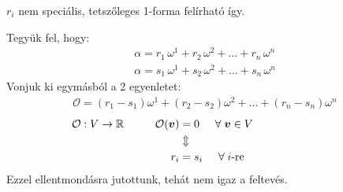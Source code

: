 \documentclass[main.tex]{subfiles}
\begin{document}
$r_i$ nem speciális, tetszőleges 1-forma felírható így.




Tegyük fel, hogy:
\begin{gather*}
  \alpha = r_1 \, \omega^1 + r_2 \, \omega^2 + \dots + r_n \, \omega^n
  \\
  \alpha = s_1 \, \omega^1 + s_2 \, \omega^2 + \dots + s_n \, \omega^n
\end{gather*}
Vonjuk ki egymásból a 2 egyenletet:
\begin{gather*}
  \mathcal{O}
  = (r_1 - s_1) \omega^1
  + (r_2 - s_2) \omega^2
  + \dots
  + (r_n - s_n) \omega^n
\end{gather*}
\begin{align*}
  \mathcal{O}: V \rightarrow \mathbb{R}
  \hspace{10mm}
  \mathcal{O}(\rvec{v}) & = 0
  \hspace{5mm}
  \forall \; \rvec{v} \in V
  \\
                        & \Updownarrow
  \\
  r_i                   & = s_i \hspace{5mm} \forall \; i \text{-re}
  \hspace{30mm}
\end{align*}
Ezzel ellentmondásra jutottunk, tehát nem igaz a feltevés.


\end{document}
